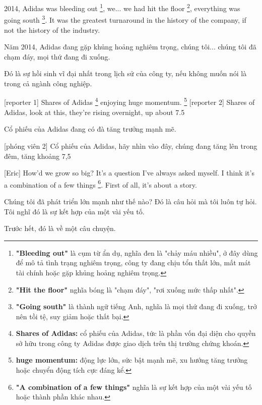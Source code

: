 \documentclass[a4paper]{article}
\begin{document}
	2014, Adidas was bleeding out \footnote{
		\textbf{"Bleeding out"} là cụm từ ẩn dụ, nghĩa đen là "chảy máu nhiều", ở đây dùng để mô tả tình trạng nghiêm trọng, công ty đang chịu tổn thất lớn, mất mát tài chính hoặc gặp khủng hoảng nghiêm trọng.
	
	}, we... we had hit the floor \footnote{
		\textbf{"Hit the floor"} nghĩa bóng là "chạm đáy", "rơi xuống mức thấp nhất".
		
	}, 
	everything was going south \footnote{
		\textbf{"Going south"} là thành ngữ tiếng Anh, nghĩa là mọi thứ đang đi xuống, trở nên tồi tệ, suy giảm hoặc thất bại.
		
	}.
	It was the greatest turnaround in the history of the company, if not the history of the industry.

	\begin{vietnamese-v2}
		Năm 2014, Adidas đang gặp khủng hoảng nghiêm trọng, chúng tôi... chúng tôi đã chạm đáy, mọi thứ đang đi xuống.  
		
		Đó là sự hồi sinh vĩ đại nhất trong lịch sử của công ty, nếu không muốn nói là trong cả ngành công nghiệp.
	\end{vietnamese-v2}

	[reporter 1] Shares of Adidas \footnote{
		\textbf{Shares of Adidas:} cổ phiếu của Adidas, tức là phần vốn đại diện cho quyền sở hữu trong công ty Adidas được giao dịch trên thị trường chứng khoán.
	
	} enjoying huge momentum. \footnote{
		\textbf{huge momentum:} động lực lớn, sức bật mạnh mẽ, xu hướng tăng trưởng hoặc chuyển động tích cực đáng kể.
	
	}
	[reporter 2] Shares of Adidas, look at this, they're rising overnight, up about 7.5%
	
	\begin{vietnamese-v2}
		 Cổ phiếu của Adidas đang có đà tăng trưởng mạnh mẽ.
		
		[phóng viên 2] Cổ phiếu của Adidas, hãy nhìn vào đây, chúng đang tăng lên trong đêm, tăng khoảng 7,5%
	\end{vietnamese-v2}
	
	\pagebreak
	
	[Eric] How'd we grow so big? It's a question I've always asked myself. I think it's a combination of a few things \footnote{
		\textbf{"A combination of a few things"} nghĩa là sự kết hợp của một vài yếu tố hoặc thành phần khác nhau.
	
	}.
	First of all, it's about a story. 
	
	\begin{vietnamese-v2}
		[Eric] Chúng tôi đã phát triển lớn mạnh như thế nào? Đó là câu hỏi mà tôi luôn tự hỏi. Tôi nghĩ đó là sự kết hợp của một vài yếu tố.
		
		Trước hết, đó là về một câu chuyện.
	\end{vietnamese-v2}
	
\end{document}
